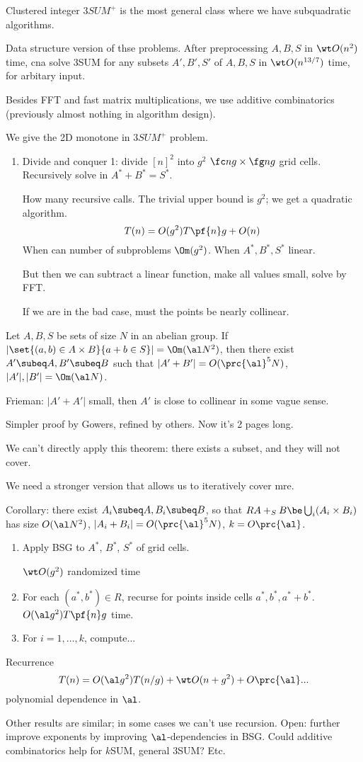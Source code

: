 Clustered integer $3SUM^+$ is the most general class where we have subquadratic algorithms.

Data structure version of thse problems.
After preprocessing $A,B,S$ in $\wt O(n^2)$ time, cna solve 3SUM for any subsets $A',B',S'$ of $A,B,S$ in $\wt O(n^{13/7})$ time, for arbitary input.

Besides FFT and fast matrix multiplications, we use additive combinatorics (previously almost nothing in algorithm design).

We give the 2D monotone in $3SUM^+$ problem. 

\begin{enumerate}
\item
Divide and conquer 1: divide $[n]^2$ into $g^2$ $\fc ng\times \fg ng$ grid cells. Recursively solve in $A^*+B^*=S^*$.

How many recursive calls. The trivial upper bound is $g^2$; we get a quadratic algorithm.
\[
T(n)=O(g^2)T\pf{n}g+O(n)
\]
When can number of subproblems $\Om(g^2)$. When $A^*,B^*,S^*$ linear. 

But then we can subtract a linear function, make all values small, solve by FFT.

If we are in the bad case, must the points be nearly collinear.
\end{enumerate}

\begin{thm}[BSG]
Let $A,B,S$ be sets of size $N$ in an abelian group. If $|\set{(a,b)\in A\times B}{a+b\in S}|=\Om(\al N^2)$, then there exist $A'\subeq A, B'\subeq B$ such that $|A'+B'|=O(\prc{\al}^5N)$, $|A'|,|B'| = \Om(\al N)$. 
\end{thm}
Frieman: $|A'+A'|$ small, then $A'$ is close to collinear in some vague sense.

Simpler proof by Gowers, refined by others. Now it's 2 pages long.

We can't directly apply this theorem: there exists a subset, and they will not cover. 

We need a stronger version that allows us to iteratively cover mre.

Corollary: there exist $A_i\subeq A,B_i\subeq B$, so that $R A+_SB \be \bigcup_i (A_i\times B_i)$ has size $O(\al N^2)$, $|A_i+B_i|=O(\prc{\al}^5N)$, $k=O\prc{\al}$.


\begin{enumerate}
\item
Apply BSG to $A^*$, $B^*$, $S^*$ of grid cells. 

$\wt O(g^2)$ randomized time
\item 
For each $(a^*,b^*)\in R$, recurse for points inside cells $a^*,b^*,a^*+b^*$. $O(\al g^2)T\pf{n}g$ time.
\item
For $i=1,\ldots, k$, compute...
\end{enumerate}
Recurrence
\[
T(n) = O(\al g^2) T(n/g) + \wt O(n+g^2)+O\prc{\al}...
\]
polynomial dependence in $\al$.

Other results are similar; in some cases we can't use recursion. Open: further improve exponents by improving $\al$-dependencies in BSG. Could additive combinatorics help for $k$SUM, general 3SUM? Etc.


